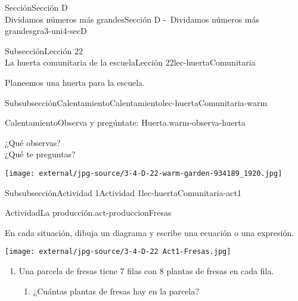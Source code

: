 \begin{sectionptx}{Sección}{{\Large Sección D\\}Dividamos números más grandes}{}{Sección D -~Dividamos números más grandes}{}{}{gra3-uni4-secD}
\begin{subsectionptx}{Subsección}{{\normalsize Lección 22\\[-0.05cm]}La huerta comunitaria de la escuela}{}{Lección 22}{}{}{lec-huertaComunitaria}
\begin{introduction}{}%
Planeemos una huerta para la escuela.%
\end{introduction}%
%
%
\typeout{************************************************}
\typeout{************************************************}
%
\begin{subsubsectionptx}{Subsubsección}{Calentamiento}{}{Calentamiento}{}{}{lec-huertaComunitaria-warm}
\begin{exploration}{Calentamiento}{Observa y pregúntate: Huerta.}{warm-observa-huerta}%
\begin{multicols}{2}
¿Qué observas?\\
 ¿Qué te preguntas?%
\vfill\columnbreak
\begin{image}{0.125}{0.75}{0.125}{}%
\texttt{[image: external/jpg-source/3-4-D-22-warm-garden-934189\_1920.jpg]}
\end{image}%
\end{multicols}
\end{exploration}%
\end{subsubsectionptx}
%
%
\typeout{************************************************}
\typeout{************************************************}
%
\begin{subsubsectionptx}{Subsubsección}{Actividad 1}{}{Actividad 1}{}{}{lec-huertaComunitaria-act1}
\begin{activity}{Actividad}{La producción.}{act-produccionFresas}%
\begin{sidebyside}{2}{0.025}{0.025}{0.05}%
\begin{sbspanel}{0.6}%
En cada situación, dibuja un diagrama y escribe una ecuación o una expresión.%
\end{sbspanel}%
\begin{sbspanel}{0.3}%
\texttt{[image: external/jpg-source/3-4-D-22 Act1-Fresas.jpg]}
\end{sbspanel}%
\end{sidebyside}%
%
\begin{enumerate}
\item{}Una parcela de fresas tiene \(7\) filas con \(8\) plantas de fresas en cada fila.%
%
\begin{enumerate}
\item{}¿Cuántas plantas de fresas hay en la parcela?%

\end{enumerate}
\end{enumerate}
\end{activity}
\end{subsubsectionptx}
\end{subsectionptx}
\end{sectionptx}
